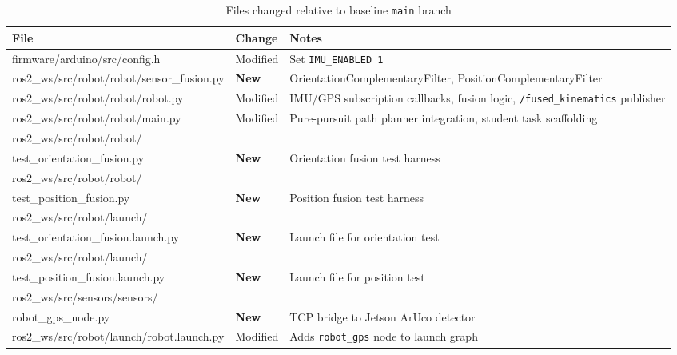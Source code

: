 \documentclass[12pt,letterpaper]{article}
\begin{document}
\begin{table}[H]
  \centering\small
  \caption{Files changed relative to baseline \texttt{main} branch}
  \label{tab:files}
  \begin{tabularx}{\textwidth}{%
    >{\ttfamily\raggedright\arraybackslash}p{}  %
    l                                                          %
    X}                                                         %
    \toprule
    \normalfont\textbf{File} & \textbf{Change} & \textbf{Notes} \\
    \midrule
    firmware/arduino/src/config.h
      & Modified & Set \texttt{IMU\_ENABLED~1} \\[2pt]
    ros2\_ws/src/robot/robot/sensor\_fusion.py
      & \textbf{New} & OrientationComplementaryFilter, PositionComplementaryFilter \\[2pt]
    ros2\_ws/src/robot/robot/robot.py
      & Modified & IMU/GPS subscription callbacks, fusion logic,
        \texttt{/fused\_kinematics} publisher \\[2pt]
    ros2\_ws/src/robot/robot/main.py
      & Modified & Pure-pursuit path planner integration, student task
        scaffolding \\[2pt]
    ros2\_ws/src/robot/robot/\\test\_orientation\_fusion.py
      & \textbf{New} & Orientation fusion test harness \\[2pt]
    ros2\_ws/src/robot/robot/\\test\_position\_fusion.py
      & \textbf{New} & Position fusion test harness \\[2pt]
    ros2\_ws/src/robot/launch/\\test\_orientation\_fusion.launch.py
      & \textbf{New} & Launch file for orientation test \\[2pt]
    ros2\_ws/src/robot/launch/\\test\_position\_fusion.launch.py
      & \textbf{New} & Launch file for position test \\[2pt]
    ros2\_ws/src/sensors/sensors/\\robot\_gps\_node.py
      & \textbf{New} & TCP bridge to Jetson ArUco detector \\[2pt]
    ros2\_ws/src/robot/launch/robot.launch.py
      & Modified & Adds \texttt{robot\_gps} node to launch graph \\
    \bottomrule
  \end{tabularx}
\end{table}
\end{document}
